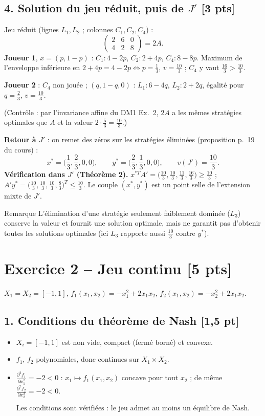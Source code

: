 \documentclass[11pt,a4paper]{article}
\begin{document}
\subsection*{4. Solution du jeu réduit, puis de $J'$ \hfill[3 pts]}
Jeu réduit (lignes $L_1,L_2$ ; colonnes $C_1,C_2,C_4$) :
\[
\begin{pmatrix}2&6&0\\4&2&8\end{pmatrix}=2A.
\]
\textbf{Joueur 1}, $x=(p,1-p)$ : $C_1:4-2p$, $C_2:2+4p$, $C_4:8-8p$. Maximum de l'enveloppe inférieure en $2+4p=4-2p\iff p=\frac13$, $v=\frac{10}{3}$ ; $C_4$ y vaut $\frac{16}3>\frac{10}3$.

\textbf{Joueur 2} : $C_4$ non jouée ; $(q,1-q,0)$ : $L_1:6-4q$, $L_2:2+2q$, égalité pour $q=\frac23$, $v=\frac{10}3$.

(Contrôle : par l'invariance affine du DM1 Ex.~2, $2A$ a les mêmes stratégies optimales que $A$ et la valeur $2\cdot\frac53=\frac{10}3$.)

\textbf{Retour à $J'$} : on remet des zéros sur les stratégies éliminées (proposition p.~19 du cours) :
\[
\boxed{x^*=\Big(\frac13,\frac23,0,0\Big),\qquad y^*=\Big(\frac23,\frac13,0,0\Big),\qquad v(J')=\frac{10}3.}
\]
\textbf{Vérification dans $J'$ (Théorème 2).}
$x^{*T}A'=\big(\frac{10}3,\frac{10}3,\frac{11}3,\frac{16}3\big)\ge\frac{10}3$ ;
$A'y^*=\big(\frac{10}3,\frac{10}3,\frac{10}3,\frac83\big)^T\le\frac{10}3$. Le couple $(x^*,y^*)$ est un point selle de l'extension mixte de $J'$. \checkmark

\begin{rembox}{Remarque}
L'élimination d'une stratégie seulement faiblement dominée ($L_3$) conserve la valeur et fournit une solution optimale, mais ne garantit pas d'obtenir toutes les solutions optimales (ici $L_3$ rapporte aussi $\frac{10}3$ contre $y^*$).
\end{rembox}

\section*{Exercice 2 -- Jeu continu \hfill[5 pts]}
$X_1=X_2=[-1,1]$, $f_1(x_1,x_2)=-x_1^2+2x_1x_2$, $f_2(x_1,x_2)=-x_2^2+2x_1x_2$.

\subsection*{1. Conditions du théorème de Nash \hfill[1,5 pt]}
\begin{itemize}
\item $X_i=[-1,1]$ est non vide, compact (fermé borné) et convexe. \checkmark
\item $f_1$, $f_2$ polynomiales, donc continues sur $X_1\times X_2$. \checkmark
\item $\frac{\partial^2f_1}{\partial x_1^2}=-2<0$ : $x_1\mapsto f_1(x_1,x_2)$ concave pour tout $x_2$ ; de même $\frac{\partial^2f_2}{\partial x_2^2}=-2<0$. \checkmark
\end{itemize}
\[\boxed{\text{Les conditions sont vérifiées : le jeu admet au moins un équilibre de Nash.}}\]
\end{document}
